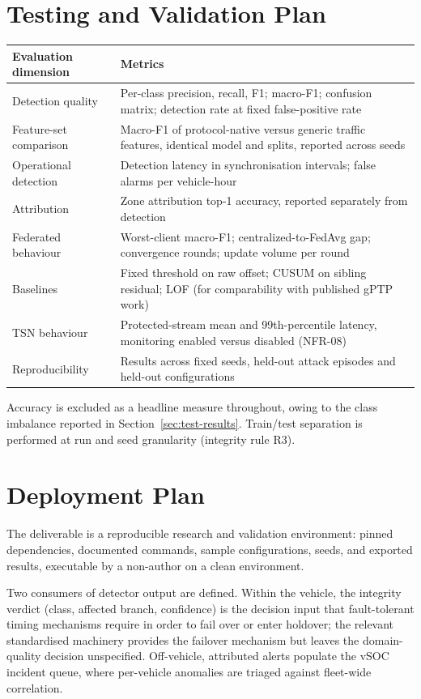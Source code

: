 \section{Testing and Validation Plan}
\label{sec:validation-plan}

\begin{longtable}{p{} p{}}
\toprule
\textbf{Evaluation dimension} & \textbf{Metrics} \\
\midrule
\endhead
Detection quality & Per-class precision, recall, F1; macro-F1; confusion matrix;
detection rate at fixed false-positive rate \\
Feature-set comparison & Macro-F1 of protocol-native versus generic traffic features,
identical model and splits, reported across seeds \\
Operational detection & Detection latency in synchronisation intervals; false alarms
per vehicle-hour \\
Attribution & Zone attribution top-1 accuracy, reported separately from detection \\
Federated behaviour & Worst-client macro-F1; centralized-to-FedAvg gap; convergence
rounds; update volume per round \\
Baselines & Fixed threshold on raw offset; CUSUM on sibling residual; LOF (for
comparability with published gPTP work) \\
TSN behaviour & Protected-stream mean and 99th-percentile latency, monitoring enabled
versus disabled (NFR-08) \\
Reproducibility & Results across fixed seeds, held-out attack episodes and held-out
configurations \\
\bottomrule
\end{longtable}

Accuracy is excluded as a headline measure throughout, owing to the class imbalance
reported in Section~\ref{sec:test-results}. Train/test separation is performed at run and seed
granularity (integrity rule R3).

\section{Deployment Plan}
\label{sec:deployment-plan}
The deliverable is a reproducible research and validation environment: pinned
dependencies, documented commands, sample configurations, seeds, and exported
results, executable by a non-author on a clean environment.

Two consumers of detector output are defined. Within the vehicle, the integrity
verdict (class, affected branch, confidence) is the decision input that
fault-tolerant timing mechanisms require in order to fail over or enter holdover; the
relevant standardised machinery provides the failover mechanism but leaves the
domain-quality decision unspecified. Off-vehicle, attributed alerts populate the vSOC
incident queue, where per-vehicle anomalies are triaged against fleet-wide
correlation.

